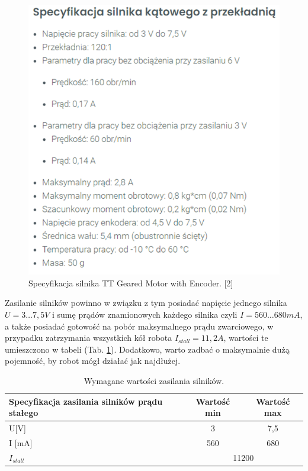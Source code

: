 \documentclass{report}
\begin{document}
\begin{figure}[H]
    \centering
    \includegraphics{src/tech_specifications/TT Geared Motor with Encoder.png}
    \caption{Specyfikacja silnika TT Geared Motor with Encoder. [2]}
    \label{fig:motor-spec}
\end{figure}

Zasilanie silników powinno w związku z tym posiadać napięcie jednego silnika $U=3\ldots7,5 V$ i sumę 
prądów znamionowych każdego silnika czyli $I=560\ldots680 mA$, a także posiadać gotowość na pobór 
maksymalnego prądu zwarciowego, w przypadku zatrzymania wszystkich kół robota $I_{stall}=11,2 A$, 
wartości te umieszczono w tabeli (Tab. \ref{tab:motors-power}). Dodatkowo, warto zadbać o maksymalnie dużą pojemność, by robot mógł działać jak najdłużej.


\begin{table}[H]
\centering
    \begin{tabular}{|m{10em}|cc|}
    \hline
    Specyfikacja zasilania silników prądu stałego & \multicolumn{1}{c|}{Wartość min} & Wartość max \\ \hline
    U{[}V{]}                                      & \multicolumn{1}{c|}{3}           & 7,5         \\ \hline
    I {[}mA{]}                                    & \multicolumn{1}{c|}{560}         & 680         \\ \hline
    $I_{stall}$                                   & \multicolumn{2}{c|}{11200}                     \\ \hline
    \end{tabular}
    \caption{Wymagane wartości zasilania silników.}
    \label{tab:motors-power}
\end{table}
\end{document}
